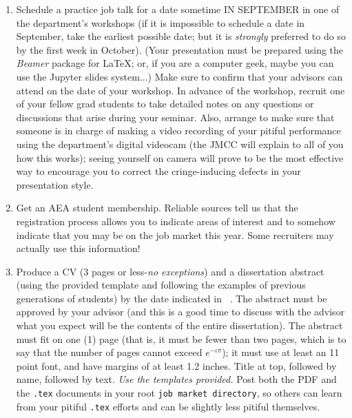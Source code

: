 \documentclass{\classes/econtex}
\begin{document}
\begin{enumerate}
  \hypertarget{Schedule-Job-Talk}{}
\item Schedule a practice job talk for a date sometime IN SEPTEMBER in one of the department's workshops (if it is impossible to schedule a date in September, take the earliest possible date; but it is \textit{strongly} preferred to do so by the first week in October).  (Your presentation must be prepared using the \textit{Beamer} package for {\LaTeX}; or, if you are a computer geek, maybe you can use the Jupyter slides system...)  Make sure to confirm that your advisors can attend on the date of your workshop.  In advance of the workshop, recruit one of your fellow grad students to take detailed notes on any questions or discussions that arise during your seminar.  Also, arrange to make sure that someone is in charge of making a video recording of your pitiful performance using the department's digital videocam (the JMCC will explain to all of you how this works); seeing yourself on camera will prove to be the most effective way to encourage you to correct the cringe-inducing defects in your presentation style.
  
  \hypertarget{Get-AEA-Membership}{}
\item Get an AEA student membership.  Reliable sources tell us that
  the registration process allows you to indicate areas of interest
  and to somehow indicate that you may be on the job market this year.
  Some recruiters may actually use this information!
  
  
  \hypertarget{CV}{}
\item Produce a CV (3 pages or less-\textit{no exceptions}) and a
  dissertation abstract (using the provided template and following the
  examples of previous generations of students) by the date indicated in ~\timet.  The
  abstract must be approved by your advisor (and this is a good time
  to discuss with the advisor what you expect will be the contents of
  the entire dissertation).  The abstract must fit on one (1) page
  (that is, it must be fewer than two pages, which is to say that the
  number of pages cannot exceed $e^{-\iota \pi}$); it must use at
  least an 11 point font, and have margins of at least 1.2 inches.  Title at
  top, followed by name, followed by text. \textit{Use the templates
    provided.}  Post both the PDF and the \texttt{.tex} documents in
  your root \texttt{job market directory}, so others can learn from your pitiful
  \texttt{.tex} efforts and can be slightly less pitiful themselves.


\end{enumerate}
\end{document}
